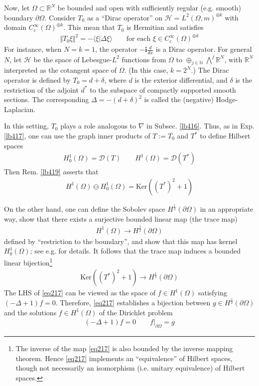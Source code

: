 \documentclass[12pt,b5paper,notitlepage]{article}
\theoremstyle{definition}
\theoremstyle{plain}
\newcommand{\ovl}{\overline}
\newcommand{\Dom}{\mathscr{D}}
\newcommand{\bk}[1]{\langle {#1}\rangle}
\newcommand{\im}{\mathbf{i}}
\newcommand{\Nbb}{\mathbb N}
\newcommand{\Rbb}{\mathbb R}
\newcommand{\Ker}{\mathrm{Ker}}
\newcommand{\MH}{\mathcal H}
\numberwithin{equation}{section}
\begin{document}
Now, let $\Omega\subset\Rbb^N$ be bounded and open with sufficiently regular (e.g. smooth) boundary $\partial\Omega$. Consider $T_0$ as a ``Dirac operator'' on $\MH=L^2(\Omega,m)^{\oplus k}$ with domain $C_c^\infty(\Omega)^{\oplus k}$. This mean that $T_0$ is Hermitian and satisfies
\begin{align*}
\Vert T_0\xi\Vert^2=-\bk{\xi|\Delta\xi}\qquad\text{for each }\xi\in C_c^\infty(\Omega)^{\oplus k}
\end{align*}
For instance, when $N=k=1$, the operator $-\im\frac d{dx}$ is a Dirac operator. For general $N$, let $\MH$ be the space of Lebesgue-$L^2$ functions from $\Omega$ to $\oplus_{j\in\Nbb}\bigwedge^j \Rbb^N$, with $\Rbb^N$ interpreted as the cotangent space of $\Omega$. (In this case, $k=2^N$.) The Dirac operator is defined by $T_0=d+\delta$, where $d$ is the exterior differential, and $\delta$ is the restriction of the adjoint $d^*$ to the subspace of compactly supported smooth sections. The corresponding $\Delta=-(d+\delta)^2$ is called the (negative) Hodge-Laplacian. 

In this setting, $T_0$ plays a role analogous to $\nabla$ in Subsec. \ref{lb416}. Thus, as in Exp. \ref{lb417}, one can use the graph inner products of $T:=\ovl{T_0}$ and $T^*$ to define Hilbert spaces
\begin{align*}
H^1_0(\Omega)=\Dom(T)\qquad H^1(\Omega)=\Dom(T^*)
\end{align*}
Then Rem. \ref{lb419} asserts that
\begin{align}
H^1(\Omega)\ominus H^1_0(\Omega)=\Ker((T^*)^2+1)
\end{align}

On the other hand, one can define the Sobolev space $H^{\frac 12}(\partial\Omega)$ in an appropriate way, show that there exists a surjective bounded linear map (the trace map)
\begin{align*}
H^1(\Omega)\rightarrow H^{\frac12}(\partial\Omega)
\end{align*}
defined by ``restriction to the boundary'', and show that this map has kernel $H^1_0(\Omega)$; see e.g. \cite[Sec. 5.5]{Eva} for details. It follows that the trace map induces a bounded linear bijection\footnote{The inverse of the map \eqref{eq217} is also bounded by the inverse mapping theorem. Hence \eqref{eq217} implements an ``equivalence'' of Hilbert spaces, though not necessarily an isomorphism (i.e. unitary equivalence) of Hilbert spaces.}
\begin{align}\label{eq217}
\Ker((T^*)^2+1)\rightarrow H^{\frac 12}(\partial\Omega)
\end{align}
The LHS of \eqref{eq217} can be viewed as the space of $f\in H^1(\Omega)$ satisfying $(-\Delta+1)f=0$. Therefore, \eqref{eq217} establishes a bijection between $g\in H^{\frac 12}(\partial\Omega)$ and the solutions $f\in H^1(\Omega)$ of the Dirichlet problem
\begin{align*}
(-\Delta+1)f=0\qquad f|_{\partial\Omega}=g
\end{align*}
\end{document}
